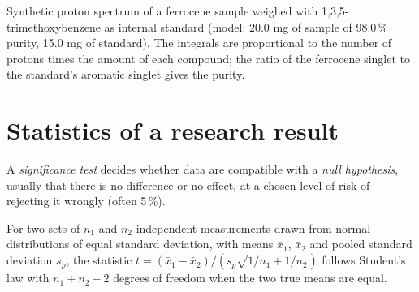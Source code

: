 \begin{omfigure}

{\small Synthetic proton spectrum of a ferrocene sample weighed with
1,3,5-trimethoxybenzene as internal standard (model: 20.0 mg of sample of 98.0\,\%
purity, 15.0 mg of standard). The integrals are proportional to the number of
protons times the amount of each compound; the ratio of the ferrocene singlet to
the standard's aromatic singlet gives the purity.}
\end{omfigure}

\section{Statistics of a research result}

\begin{definition}\label{def:b3:lab-techniques-3:tests}
A \emph{significance test} decides whether data are
compatible with a \emph{null hypothesis}, usually that
there is no difference or no effect, at a chosen level of risk of rejecting it
wrongly (often 5\,\%).
\end{definition}

\begin{theorem}\label{thm:b3:lab-techniques-3:t-test}
For two sets of $n_1$ and $n_2$ independent measurements drawn from normal
distributions of equal standard deviation, with means $\bar x_1$, $\bar x_2$ and pooled
standard deviation $s_p$, the statistic $t = (\bar x_1 - \bar x_2)/(s_p\sqrt{1/n_1 + 1/n_2})$ follows Student's law with
$n_1 + n_2 - 2$ degrees of freedom when the two true means are equal. \admitted
\end{theorem}

